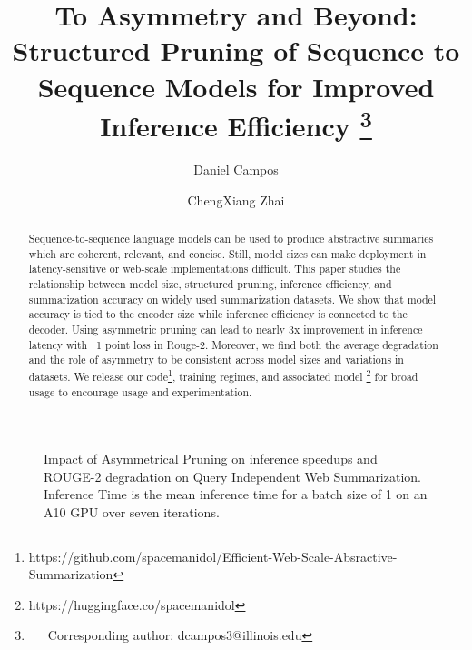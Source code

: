\documentclass[11pt]{article}
\title{To Asymmetry and Beyond: Structured Pruning of Sequence to Sequence Models for Improved Inference Efficiency  \thanks{~~~Corresponding author: dcampos3@illinois.edu}}
\author[1,2]{Daniel Campos}
\author[1]{ChengXiang Zhai}
\affil[1]{Department of Computer Science, the University of Illinois Urbana-Champaign}
\affil[2]{Neeva Inc.}
\begin{document}
\maketitle
\begin{abstract}
Sequence-to-sequence language models can be used to produce abstractive summaries which are coherent, relevant, and concise. Still, model sizes can make deployment in latency-sensitive or web-scale implementations difficult. This paper studies the relationship between model size, structured pruning, inference efficiency, and summarization accuracy on widely used summarization datasets. We show that model accuracy is tied to the encoder size while inference efficiency is connected to the decoder. Using asymmetric pruning can lead to nearly 3x improvement in inference latency with ~1 point loss in Rouge-2. Moreover, we find both the average degradation and the role of asymmetry to be consistent across model sizes and variations in datasets.  We release our code\footnote{https://github.com/spacemanidol/Efficient-Web-Scale-Absractive-Summarization}, training regimes, and associated model \footnote{https://huggingface.co/spacemanidol} for broad usage to encourage usage and experimentation. 
 \end{abstract}
\begin{figure}[!htb]
    \centering
    \caption{Impact of Asymmetrical Pruning on inference speedups and ROUGE-2 degradation on Query Independent Web Summarization. Inference Time is the mean inference time for a batch size of 1 on an A10 GPU over seven iterations.   }
    \label{fig:speed}
\end{figure}
\end{document}
